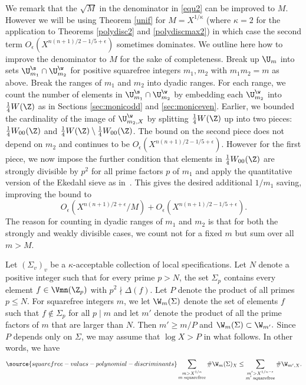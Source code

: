 We remark that the $\sqrt{M}$ in the denominator in \eqref{equ2} can
be improved to $M$. However we will be using Theorem \ref{unif} for
$M=X^{1/\kappa}$ (where $\kappa=2$ for the application to Theorems
\ref{polydisc2} and \ref{polydiscmax2}) in which case the second term
$O_\epsilon(X^{n(n+1)/2-1/5+\epsilon})$ sometimes dominates. We
outline here how to improve the denominator to $M$ for the sake of
completeness. Break up $\U_m$ into sets $\U_{m_1}^\s\cap\U_{m_2}^\w$
for positive squarefree integers $m_1,m_2$ with $m_1m_2=m$ as
above. Break the ranges of $m_1$ and $m_2$ into dyadic ranges. For
each range, we count the number of elements in
$\U_{m_1}^\s\cap\U_{m_2}^\w$ by embedding each $\U_{m_2}^\w$ into
$\frac14W(\Z)$ as in Sections \ref{sec:monicodd} and
\ref{sec:moniceven}. Earlier, we bounded the cardinality of the image
of $\U_{m_2,X}^\w$ by splitting $\frac14W(\Z)$ up into two pieces:
$\frac14W_{00}(\Z)$ and $\frac14W(\Z)\setminus\frac14W_{00}(\Z)$. The
bound on the second piece does not depend on $m_2$ and continues to be
$O_\epsilon(X^{n(n+1)/2-1/5+\epsilon})$. However for the first piece,
we now impose the further condition that elements in $\frac14
W_{00}(\Z)$ are strongly divisible by $p^2$ for all prime factors $p$
of $m_1$ and apply the quantitative version of the Ekedahl sieve as
in~\cite{geosieve}. This gives the desired additional $1/m_1$ saving,
improving the bound to
\begin{equation*}
O_\epsilon(X^{n(n+1)/2+\epsilon}/M)+O_\epsilon(X^{n(n+1)/2-1/5+\epsilon}).
\end{equation*}
The reason for counting in dyadic ranges of $m_1$ and $m_2$ is
that for both the strongly and weakly divisible cases, we count
not for a fixed $m$ but sum over all $m>M$.




Let $(\Sigma_v)_v$ be a $\kappa$-acceptable collection of local
specifications. Let $N$ denote a positive integer such that for every
prime $p>N$, the set $\Sigma_p$ contains every element $f\in
\Vmn(\Z_p)$ with $p^2\nmid \Delta(f)$. Let $P$ denote the product of
all primes $p\leq N$. For squarefree integers $m$, we let
$\W_m(\Sigma)$ denote the set of elements $f$ such that
$f\not\in\Sigma_p$ for all $p\mid m$ and let $m'$ denote the product
of all the prime factors of $m$ that are larger than $N$. Then $m'\geq
m/P$ and $\W_m(\Sigma)\subset \W_{m'}.$ Since $P$ depends only on
$\Sigma$, we may assume that $\log X > P$ in what follows. In other
words, we have
\begin{equation}\label{eq:haha}
\source{squarefree-values-polynomial-discriminants}
\sum_{\substack{m>X^{1/\kappa}\\ m\;\mathrm{ squarefree}}}\#\W_{m}(\Sigma)_X \leq \sum_{\substack{m'>X^{1/\kappa-\epsilon}\\ m'\;\mathrm{ squarefree}}}\#\W_{m',X}.
\end{equation}

